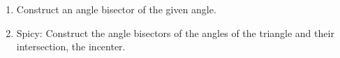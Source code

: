 \begin{enumerate}
  \item Construct an angle bisector of the given angle.
    \vspace{3cm}
    \begin{center}
    \end{center}

\newpage
  \item Spicy: Construct the angle bisectors of the angles of the triangle and their intersection, the incenter.\\
    \vspace{3cm}
    \begin{center}
    \end{center}



\end{enumerate}

